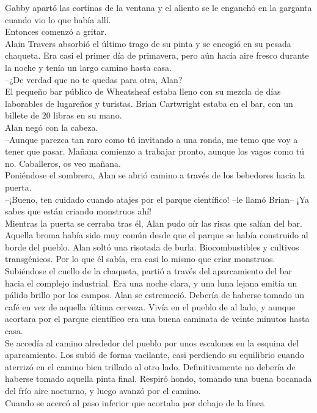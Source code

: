 Gabby apartó las cortinas de la ventana y el aliento se le enganchó en
la garganta cuando vio lo que había allí.\\
Entonces comenzó a gritar.\\
Alain Travers absorbió el último trago de su pinta y se encogió en su
pesada chaqueta. Era casi el primer día de primavera, pero aún hacía
aire fresco durante la noche y tenía un largo camino hasta casa.\\
--¿De verdad que no te quedas para otra, Alan?\\
El pequeño bar público de Wheatsheaf estaba lleno con su mezcla de días
laborables de lugareños y turistas. Brian Cartwright estaba en el bar,
con un billete de 20 libras en su mano.\\
Alan negó con la cabeza.\\
--Aunque parezca tan raro como tú invitando a una ronda, me temo que voy
a tener que pasar. Mañana comienzo a trabajar pronto, aunque los vagos
como tú no. Caballeros, os veo mañana.\\
Poniéndose el sombrero, Alan se abrió camino a través de los bebedores
hacia la puerta.\\
--¡Bueno, ten cuidado cuando atajes por el parque científico! --le llamó
Brian-- ¡Ya sabes que están criando monstruos ahí!\\
Mientras la puerta se cerraba tras él, Alan pudo oír las risas que
salían del bar. Aquella broma había sido muy común desde que el parque
se había construido al borde del pueblo. Alan soltó una risotada de
burla. Biocombustibles y cultivos transgénicos. Por lo que él sabía, era
casi lo mismo que criar monstruos.\\
Subiéndose el cuello de la chaqueta, partió a través del aparcamiento
del bar hacia el complejo industrial. Era una noche clara, y una luna
lejana emitía un pálido brillo por los campos. Alan se estremeció.
Debería de haberse tomado un café en vez de aquella última cerveza.
Vivía en el pueblo de al lado, y aunque acortara por el parque
científico era una buena caminata de veinte minutos hasta casa.\\
Se accedía al camino alrededor del pueblo por unos escalones en la
esquina del aparcamiento. Los subió de forma vacilante, casi perdiendo
su equilibrio cuando aterrizó en el camino bien trillado al otro lado.
Definitivamente no debería de haberse tomado aquella pinta final.
Respiró hondo, tomando una buena bocanada del frío aire nocturno, y
luego avanzó por el camino.\\
Cuando se acercó al paso inferior que acortaba por debajo de la línea
